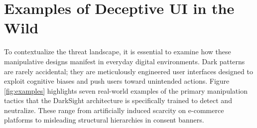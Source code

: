 \documentclass[12pt,a4paper]{article}
\begin{document}
\section{Examples of Deceptive UI in the Wild}
To contextualize the threat landscape, it is essential to examine how these manipulative designs manifest in everyday digital environments. Dark patterns are rarely accidental; they are meticulously engineered user interfaces designed to exploit cognitive biases and push users toward unintended actions. Figure \ref{fig:examples} highlights seven real-world examples of the primary manipulation tactics that the DarkSight architecture is specifically trained to detect and neutralize. These range from artificially induced scarcity on e-commerce platforms to misleading structural hierarchies in consent banners.
\end{document}
